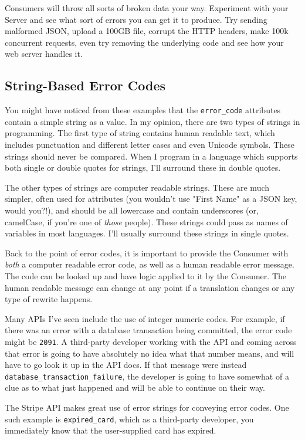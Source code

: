 \documentclass{book}
\begin{document}
Consumers will throw all sorts of broken data your way. Experiment with your Server and see what sort of errors you can get it to produce. Try sending malformed JSON, upload a 100GB file, corrupt the HTTP headers, make 100k concurrent requests, even try removing the underlying code and see how your web server handles it.

\subsection{String-Based Error Codes}

You might have noticed from these examples that the \texttt{error\_code} attributes contain a simple string as a value. In my opinion, there are two types of strings in programming. The first type of string contains human readable text, which includes punctuation and different letter cases and even Unicode symbols. These strings should never be compared. When I program in a language which supports both single or double quotes for strings, I'll surround these in double quotes.

The other types of strings are computer readable strings. These are much simpler, often used for attributes (you wouldn't use "First Name" as a JSON key, would you?!), and should be all lowercase and contain underscores (or, camelCase, if you're one of \emph{those} people). These strings could pass as names of variables in most languages. I'll usually surround these strings in single quotes.

Back to the point of error codes, it is important to provide the Consumer with \emph{both} a computer readable error code, as well as a human readable error message. The code can be looked up and have logic applied to it by the Consumer. The human readable message can change at any point if a translation changes or any type of rewrite happens.

Many APIs I've seen include the use of integer numeric codes. For example, if there was an error with a database transaction being committed, the error code might be \texttt{2091}. A third-party developer working with the API and coming across that error is going to have absolutely no idea what that number means, and will have to go look it up in the API docs. If that message were instead \texttt{database\_transaction\_failure}, the developer is going to have somewhat of a clue as to what just happened and will be able to continue on their way.

The Stripe API \cite[\#Errors]{stripe_api} makes great use of error strings for conveying error codes. One such example is \texttt{expired\_card}, which as a third-party developer, you immediately know that the user-supplied card has expired.
\end{document}
